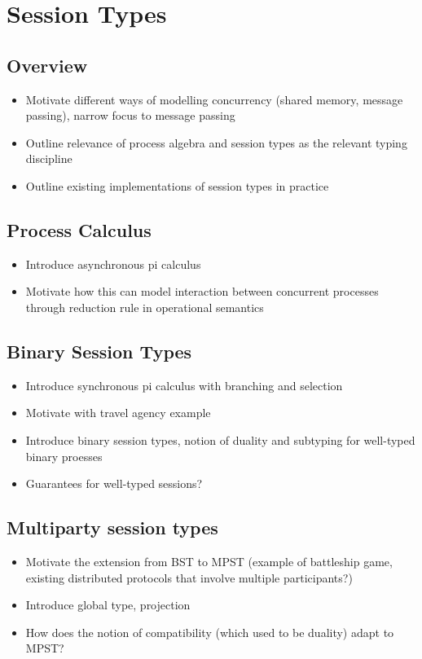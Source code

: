 \section{Session Types}

\subsection{Overview}
\begin{itemize}
\item Motivate different ways of modelling concurrency (shared memory, message passing), narrow focus to message passing
\item Outline relevance of process algebra and session types as the relevant typing discipline
\item Outline existing implementations of session types in practice
\end{itemize}

\subsection{Process Calculus}
\begin{itemize}
\item Introduce asynchronous pi calculus
\item Motivate how this can model interaction between concurrent processes through reduction rule in operational semantics
\end{itemize}

\subsection{Binary Session Types}
\begin{itemize}
\item Introduce synchronous pi calculus with branching and selection
\item Motivate with travel agency example
\item Introduce binary session types, notion of duality and subtyping for well-typed binary proesses
\item Guarantees for well-typed sessions?
\end{itemize}

\subsection{Multiparty session types}
\begin{itemize}
\item Motivate the extension from BST to MPST (example of battleship game, existing distributed protocols that involve multiple participants?)
\item Introduce global type, projection
\item How does the notion of compatibility (which used to be duality) adapt to MPST?
\end{itemize}